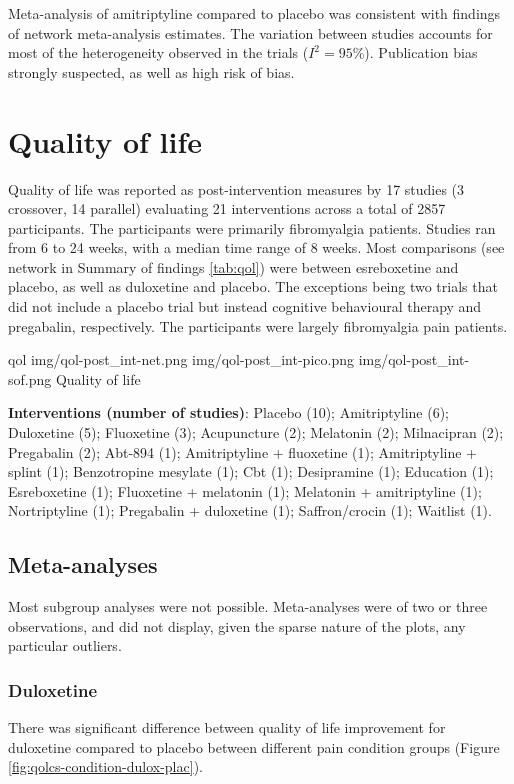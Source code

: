 \documentclass{report}\usepackage[]{graphicx}\usepackage[]{color}
\begin{document}
Meta-analysis of amitriptyline compared to placebo was consistent with findings of network meta-analysis estimates. The variation between studies accounts for most of the heterogeneity observed in the trials ($I^2 = 95$\%). Publication bias strongly suspected, as well as high risk of bias.


\section{Quality of life}

Quality of life was reported as post-intervention measures by 17 studies (3 crossover, 14 parallel) evaluating 21 interventions across a total of 2857 participants. The participants were primarily fibromyalgia patients. Studies ran from 6 to 24 weeks, with a median time range of 8 weeks. Most comparisons (see network in Summary of findings \ref{tab:qol}) were between esreboxetine and placebo, as well as duloxetine and placebo. The exceptions being two trials that did not include a placebo trial but instead cognitive behavioural therapy and pregabalin, respectively. The participants were largely fibromyalgia pain patients.


\soffignew
{qol}
{img/qol-post_int-net.png}
{img/qol-post_int-pico.png}
{img/qol-post_int-sof.png}
{Quality of life}

\textbf{Interventions (number of studies)}: Placebo (10); Amitriptyline (6); Duloxetine (5); Fluoxetine (3); Acupuncture (2); Melatonin (2); Milnacipran (2); Pregabalin (2); Abt-894 (1); Amitriptyline + fluoxetine (1); Amitriptyline + splint (1); Benzotropine mesylate (1); Cbt (1); Desipramine (1); Education (1); Esreboxetine (1); Fluoxetine + melatonin (1); Melatonin + amitriptyline (1); Nortriptyline (1); Pregabalin + duloxetine (1); Saffron/crocin (1); Waitlist (1).


\subsection{Meta-analyses}

Most subgroup analyses were not possible. Meta-analyses were of two or three observations, and did not display, given the sparse nature of the plots, any particular outliers.

\subsubsection{Duloxetine}

There was significant difference between quality of life improvement for duloxetine compared to placebo between different pain condition groups (Figure \ref{fig:qolcs-condition-dulox-plac}).
\end{document}
